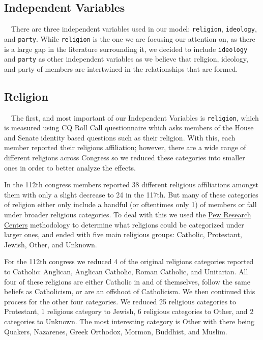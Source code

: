 \documentclass[Royal,times,sageh]{sagej}
\begin{document}
\hypertarget{independent-variables}{%
\subsection{Independent Variables}\label{independent-variables}}

\doublespacing

~~There are three independent variables used in our model: \texttt{religion}, \texttt{ideology}, and \texttt{party}. While \texttt{religion} is the one we are focusing our attention on, as there is a large gap in the literature surrounding it, we decided to include \texttt{ideology} and \texttt{party} as other independent variables as we believe that religion, ideology, and party of members are intertwined in the relationships that are formed.

\hypertarget{religion}{%
\subsection{Religion}\label{religion}}

\doublespacing

~~The first, and most important of our Independent Variables is \texttt{religion}, which is measured using CQ Roll Call questionnaire which asks members of the House and Senate identity based questions such as their religion. With this, each member reported their religious affiliation; however, there are a wide range of different religions across Congress so we reduced these categories into smaller ones in order to better analyze the effects.

In the 112th congress members reported 38 different religious affiliations amongst them with only a slight decrease to 24 in the 117th. But many of these categories of religion either only include a handful (or oftentimes only 1) of members or fall under broader religious categories. To deal with this we used the \href{https://www.pewresearch.org/religion/2021/01/04/faith-on-the-hill-2021/}{Pew Research Centers} methodology to determine what religions could be categorized under larger ones, and ended with five main religious groups: Catholic, Protestant, Jewish, Other, and Unknown.

For the 112th congress we reduced 4 of the original religions categories reported to Catholic: Anglican, Anglican Catholic, Roman Catholic, and Unitarian. All four of these religions are either Catholic in and of themselves, follow the same beliefs as Catholicism, or are an offshoot of Catholicism. We then continued this process for the other four categories. We reduced 25 religious categories to Protestant, 1 religious category to Jewish, 6 religious categories to Other, and 2 categories to Unknown. The most interesting category is Other with there being Quakers, Nazarenes, Greek Orthodox, Mormon, Buddhist, and Muslim.
\end{document}
